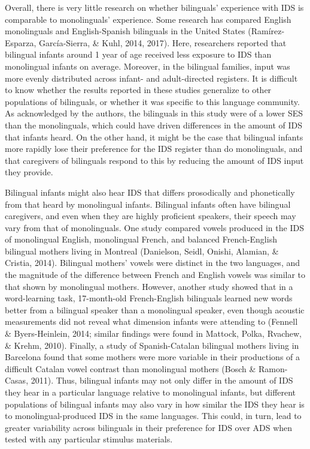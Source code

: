 \documentclass[,man,floatsintext]{apa6}
\begin{document}
Overall, there is very little research on whether bilinguals' experience with IDS is comparable to monolinguals' experience. Some research has compared English monolinguals and English-Spanish bilinguals in the United States (Ramírez-Esparza, García-Sierra, \& Kuhl, 2014, 2017). Here, researchers reported that bilingual infants around 1 year of age received less exposure to IDS than monolingual infants on average. Moreover, in the bilingual families, input was more evenly distributed across infant- and adult-directed registers. It is difficult to know whether the results reported in these studies generalize to other populations of bilinguals, or whether it was specific to this language community. As acknowledged by the authors, the bilinguals in this study were of a lower SES than the monolinguals, which could have driven differences in the amount of IDS that infants heard. On the other hand, it might be the case that bilingual infants more rapidly lose their preference for the IDS register than do monolinguals, and that caregivers of bilinguals respond to this by reducing the amount of IDS input they provide.

Bilingual infants might also hear IDS that differs prosodically and phonetically from that heard by monolingual infants. Bilingual infants often have bilingual caregivers, and even when they are highly proficient speakers, their speech may vary from that of monolinguals. One study compared vowels produced in the IDS of monolingual English, monolingual French, and balanced French-English bilingual mothers living in Montreal (Danielson, Seidl, Onishi, Alamian, \& Cristia, 2014). Bilingual mothers' vowels were distinct in the two languages, and the magnitude of the difference between French and English vowels was similar to that shown by monolingual mothers. However, another study showed that in a word-learning task, 17-month-old French-English bilinguals learned new words better from a bilingual speaker than a monolingual speaker, even though acoustic measurements did not reveal what dimension infants were attending to (Fennell \& Byers-Heinlein, 2014; similar findings were found in Mattock, Polka, Rvachew, \& Krehm, 2010). Finally, a study of Spanish-Catalan bilingual mothers living in Barcelona found that some mothers were more variable in their productions of a difficult Catalan vowel contrast than monolingual mothers (Bosch \& Ramon-Casas, 2011). Thus, bilingual infants may not only differ in the amount of IDS they hear in a particular language relative to monolingual infants, but different populations of bilingual infants may also vary in how similar the IDS they hear is to monolingual-produced IDS in the same languages. This could, in turn, lead to greater variability across bilinguals in their preference for IDS over ADS when tested with any particular stimulus materials.
\end{document}
